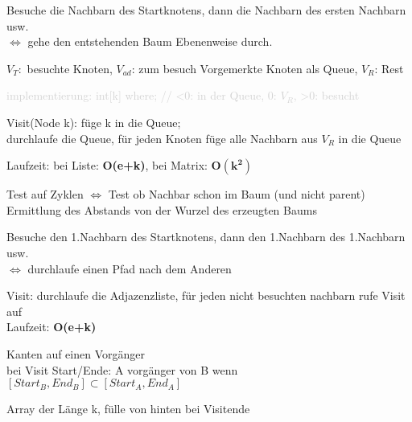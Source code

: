 Besuche die Nachbarn des Startknotens, dann die Nachbarn des ersten Nachbarn usw.\\
$\Leftrightarrow$ gehe den entstehenden Baum Ebenenweise durch.

$V_T:$ besuchte Knoten, $V_{ad}$: zum besuch Vorgemerkte Knoten als Queue, $V_R$: Rest

\textcolor{lightgray}{implementierung: int[k] where; // <0: in der Queue, 0: $V_R$, >0: besucht }%

Visit(Node k): füge k in die Queue;\\
durchlaufe die Queue, für jeden Knoten füge alle Nachbarn aus $V_R$ in die Queue

Laufzeit: bei Liste:\textbf{ O(e+k)}, bei Matrix: $\mathbf{O(k^2)}$

 Test auf Zyklen $\Leftrightarrow$ Test ob Nachbar schon im Baum (und nicht parent)\\
Ermittlung des Abstands von der Wurzel des erzeugten Baums


Besuche den 1.Nachbarn des Startknotens, dann den 1.Nachbarn des 1.Nachbarn usw.\\
$\Leftrightarrow$ durchlaufe einen Pfad nach dem Anderen

Visit: durchlaufe die Adjazenzliste, für jeden nicht besuchten nachbarn rufe Visit auf\\
Laufzeit: \textbf{O(e+k)}


 Kanten auf einen Vorgänger\\
bei Visit Start/Ende: A vorgänger von B wenn $[Start_B,End_B] \subset  [Start_A,End_A]$

 Array der Länge k, fülle von hinten bei Visitende\\

\newpage
{}


